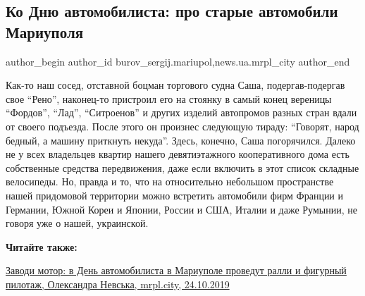  
 
 
 
 
 
\subsection{Ко Дню автомобилиста: про старые автомобили Мариуполя}
\label{sec:26_10_2019.stz.news.ua.mrpl_city.1.starye_avtomobili_mariupolja}
 
\ifcmt
 author_begin
   author_id burov_sergij.mariupol,news.ua.mrpl_city
 author_end
\fi

Как-то наш сосед, отставной боцман торгового судна Саша, подергав-подергав свое
\enquote{Рено}, наконец-то пристроил его на стоянку в самый конец вереницы \enquote{Фордов},
\enquote{Лад}, \enquote{Ситроенов} и других изделий автопромов разных стран вдали от своего
подъезда. После этого он произнес следующую тираду: \enquote{Говорят, народ бедный, а
машину приткнуть некуда}. Здесь, конечно, Саша погорячился. Далеко не у всех
владельцев квартир нашего девятиэтажного кооперативного дома есть собственные
средства передвижения, даже если включить в этот список складные велосипеды.
Но, правда и то, что на относительно небольшом пространстве нашей придомовой
территории можно встретить автомобили фирм Франции и Германии, Южной Кореи и
Японии, России и США, Италии и даже Румынии, не говоря уже о нашей, украинской.


\textbf{Читайте также:} 

\href{https://mrpl.city/news/view/zavodi-motor-v-den-avtomobilista-v-mariupole-provedut-ralli-i-figurnyj-pilotazh}{
%
Заводи мотор: в День автомобилиста в Мариуполе проведут ралли и фигурный пилотаж, %
Олександра Невська, mrpl.city, 24.10.2019}

